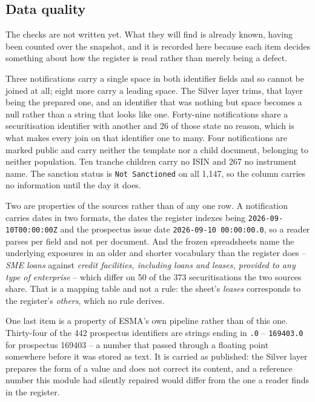 \subsection{Data quality}

The checks are not written yet. What they will find is already known, having been counted over the snapshot, and it is recorded here because each item decides something about how the register is read rather than merely being a defect.

Three notifications carry a single space in both identifier fields and so cannot be joined at all; eight more carry a leading space. The Silver layer trims, that layer being the prepared one, and an identifier that was nothing but space becomes a null rather than a string that looks like one. Forty-nine notifications share a securitisation identifier with another and 26 of those state no reason, which is what makes every join on that identifier one to many. Four notifications are marked public and carry neither the template nor a child document, belonging to neither population. Ten tranche children carry no ISIN and 267 no instrument name. The sanction status is \verb|Not Sanctioned| on all 1{,}147, so the column carries no information until the day it does.

Two are properties of the sources rather than of any one row. A notification carries dates in two formats, the dates the register indexes being \verb|2026-09-10T00:00:00Z| and the prospectus issue date \verb|2026-09-10 00:00:00.0|, so a reader parses per field and not per document. And the frozen spreadsheets name the underlying exposures in an older and shorter vocabulary than the register does -- \emph{SME loans} against \emph{credit facilities, including loans and leases, provided to any type of enterprise} -- which differ on 50 of the 373 securitisations the two sources share. That is a mapping table and not a rule: the sheet's \emph{leases} corresponds to the register's \emph{others}, which no rule derives.

One last item is a property of ESMA's own pipeline rather than of this one. Thirty-four of the 442 prospectus identifiers are strings ending in \verb|.0| -- \verb|169403.0| for prospectus 169403 -- a number that passed through a floating point somewhere before it was stored as text. It is carried as published: the Silver layer prepares the form of a value and does not correct its content, and a reference number this module had silently repaired would differ from the one a reader finds in the register.

